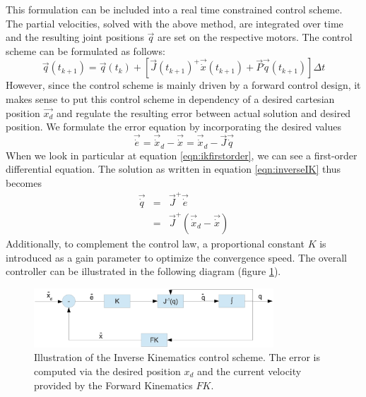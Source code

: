 This formulation can be included into a real time constrained control scheme. The partial velocities, solved with the above method, are integrated over time and the resulting joint positions $\vec{q}$ are set on the respective motors. The control scheme can be formulated as follows:
\begin{equation}
\vec{q}(t_{k+1}) = \vec{q}(t_{k}) + [ \vec{J}(t_{k+1})^+\vec{\dot{x}}(t_{k+1}) + \vec{P}\vec{\dot{q}}(t_{k+1}) ] \Delta t
\end{equation}
However, since the control scheme is mainly driven by a forward control design, it makes sense to put this control scheme in dependency of a desired cartesian position $\vec{x_d}$ and regulate the resulting error between actual solution and desired position.
We formulate the error equation by incorporating the desired values
\begin{equation}\label{eqn:ikfirstorder}
\vec{\dot{e}} =  \vec{\dot{x}}_d - \vec{\dot{x}} =  \vec{\dot{x}}_d - \vec{J}\vec{\dot{q}}
\end{equation}
When we look in particular at equation \ref{eqn:ikfirstorder}, we can see a first-order differential equation. The solution as written in equation \ref{eqn:inverseIK} thus becomes
\begin{eqnarray}
\vec{\dot{q}} &=& \vec{J}^+\vec{\dot{e}} \\
			   &=& \vec{J}^+(\vec{\dot{x}}_d - \vec{\dot{x}})
\end{eqnarray}
Additionally, to complement the control law, a proportional constant $K$ is introduced as a gain parameter to optimize the convergence speed. The overall controller can be illustrated in the following diagram (figure \ref{fig:ikcontrolloop}).
\begin{figure}[h!]
  \centering
    \includegraphics[width=0.8\textwidth]{../figures/ikcontrolloop.eps}
    \caption{Illustration of the Inverse Kinematics control scheme. The error is computed via the desired position $x_d$ and the current velocity provided by the Forward Kinematics $FK$.}
    \label{fig:ikcontrolloop}
\end{figure}
